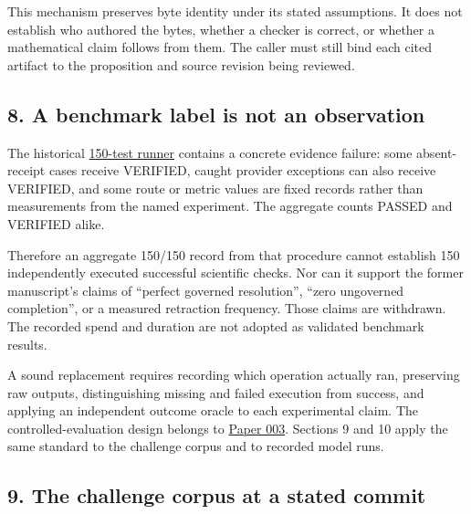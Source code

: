 \documentclass[
  11pt,
]{article}
\begin{document}
This mechanism preserves byte identity under its stated assumptions. It
does not establish who authored the bytes, whether a checker is correct,
or whether a mathematical claim follows from them. The caller must still
bind each cited artifact to the proposition and source revision being
reviewed.

\hypertarget{a-benchmark-label-is-not-an-observation}{%
\subsection{8. A benchmark label is not an
observation}\label{a-benchmark-label-is-not-an-observation}}

The historical
\href{https://github.com/dbccpage/the_symbol_game/blob/52cb5457f6c485ba548cfd292f6012a941ed22cf/omega_engine_projects/mssn_sn_symgam/challenges/run_150_tests_suite.py}{150-test
runner} contains a concrete evidence failure: some absent-receipt cases
receive VERIFIED, caught provider exceptions can also receive VERIFIED,
and some route or metric values are fixed records rather than
measurements from the named experiment. The aggregate counts PASSED and
VERIFIED alike.

Therefore an aggregate 150/150 record from that procedure cannot
establish 150 independently executed successful scientific checks. Nor
can it support the former manuscript's claims of ``perfect governed
resolution'', ``zero ungoverned completion'', or a measured retraction
frequency. Those claims are withdrawn. The recorded spend and duration
are not adopted as validated benchmark results.

A sound replacement requires recording which operation actually ran,
preserving raw outputs, distinguishing missing and failed execution from
success, and applying an independent outcome oracle to each experimental
claim. The controlled-evaluation design belongs to
\href{https://github.com/dbccpage/the_symbol_game/blob/23893fc44162555fa12ceda3e1665982e3d7a14e/omega_engine_atlas/coda_atlas/omega_engine_symbol_game/003_pfp_host_admitted_failure_detectors/paper.md}{Paper
003}. Sections 9 and 10 apply the same standard to the challenge corpus
and to recorded model runs.

\hypertarget{the-challenge-corpus-at-a-stated-commit}{%
\subsection{9. The challenge corpus at a stated
commit}\label{the-challenge-corpus-at-a-stated-commit}}
\end{document}
